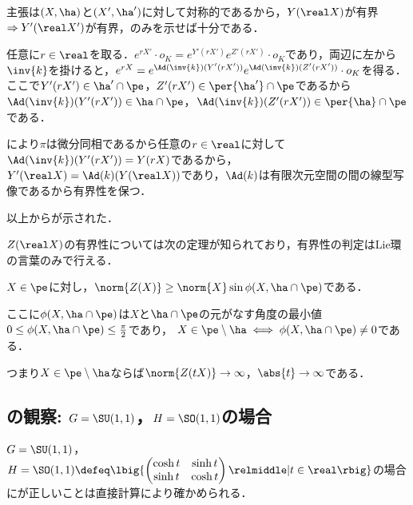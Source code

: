 \begin{pfwn}{}

  主張は$(X,\ha) $と$(X',\ha')$に対して対称的であるから，$Y(\real X) $が有界$\Rightarrow Y'(\real X') $が有界，のみを示せば十分である．

  任意に$r\in \real$を取る．$e^{rX'}\cdot o_K = e^{Y'(r X')}e^{Z'(r X')}\cdot o_K  $であり，両辺に左から$\inv{k} $を掛けると，$e^{r X} = e^{\Ad(\inv{k})( Y'(r X'))}e^{\Ad(\inv{k})( Z'(r X'))}\cdot o_K  $を得る．ここで$Y'(rX')\in \ha'\cap \pe $，$Z'(r X')\in \per{\ha'}\cap \pe $であるから$\Ad(\inv{k})(Y'(r X'))\in \ha\cap \pe $，$\Ad(\inv{k})(Z'(r X')) \in \per{\ha}\cap \pe $である．

  により$\pi$は微分同相であるから任意の$r\in \real$に対して$\Ad(\inv{k})(Y'(r X')) = Y(rX)  $であるから，$Y'(\real X) = \Ad(k)(Y(\real X))  $であり，$\Ad(k) $は有限次元空間の間の線型写像であるから有界性を保つ．

  以上からが示された．
  
\end{pfwn}


$Z(\real X) $の有界性については次の定理が知られており，有界性の判定はLie環の言葉のみで行える．

\begin{thm}\cite[Lemmma~5.4]{kob97}\label{thm:kob97}
  
  $X\in \pe$に対し，$\norm{Z(X)}\geq \norm{X} \sin\phi(X, \ha\cap\pe)$である．

  ここに$\phi(X,\ha\cap \pe) $は$X$と$\ha\cap \pe$の元がなす角度の最小値$0\leq \phi(X,\ha\cap \pe) \leq \frac{\pi}{2} $であり，
  $X\in \pe\setminus \ha \iff \phi(X,\ha\cap \pe)\neq 0 $である．
\end{thm}

つまり$ X\in \pe\setminus \ha$ならば$\norm{Z(t X)}\to \infty $，$\abs{t}\to \infty $である．


\subsection{の観察: $G = \SU(1,1) $，$H = \SO(1,1) $の場合}

$G = \SU(1,1) $，$H = \SO(1,1) \defeq\lbig\{
\begin{pmatrix}
  \cosh t & \sinh t\\ \sinh t & \cosh t
\end{pmatrix}
\relmiddle| t\in \real \rbig\} $の場合にが正しいことは直接計算により確かめられる．

